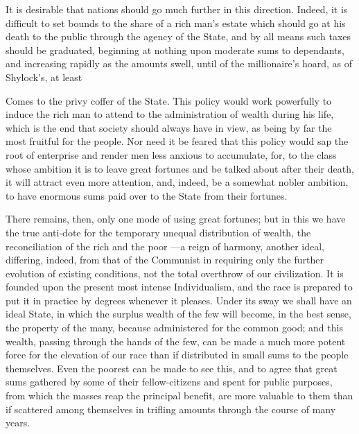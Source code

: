 \documentclass[11pt,openany]{book}
\begin{document}
It is desirable that nations should go much further in this direction. Indeed, it is difficult to set bounds to the share of a rich man's estate which should go at his death to the public through the agency of the State, and by all means such taxes should be graduated, beginning at nothing upon moderate sums to dependants, and increasing rapidly as the amounts swell, until of the millionaire's hoard, as of Shylock's, at least

Comes to the privy coffer of the State. This policy would work powerfully to induce the rich man to attend to the administration of wealth during his life, which is the end that society should always have in view, as being by far the most fruitful for the people. Nor need it be feared that this policy would sap the root of enterprise and render men less anxious to accumulate, for, to the class whose ambition it is to leave great fortunes and be talked about after their death, it will attract even more attention, and, indeed, be a somewhat nobler ambition, to have enormous sums paid over to the State from their fortunes.

There remains, then, only one mode of using great fortunes; but in this we have the true anti-dote for the temporary unequal distribution of wealth, the reconciliation of the rich and the poor ---a reign of harmony, another ideal, differing, indeed, from that of the Communist in requiring only the further evolution of existing conditions, not the total overthrow of our civilization. It is founded upon the present most intense Individualism, and the race is prepared to put it in practice by degrees whenever it pleases. Under its sway we shall have an ideal State, in which the surplus wealth of the few will become, in the best sense, the property of the many, because administered for the common good; and this wealth, passing through the hands of the few, can be made a much more potent force for the elevation of our race than if distributed in small sums to the people themselves. Even the poorest can be made to see this, and to agree that great sums gathered by some of their fellow-citizens and spent for public purposes, from which the masses reap the principal benefit, are more valuable to them than if scattered among themselves in trifling amounts through the course of many years.
\end{document}
